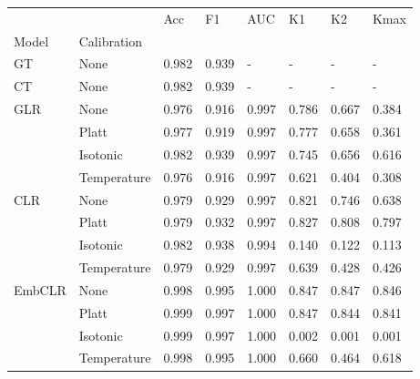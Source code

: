 \begin{tabular}{llllllll}
\toprule
 &  & Acc & F1 & AUC & K1 & K2 & Kmax \\
Model & Calibration &  &  &  &  &  &  \\
\midrule
GT & None & 0.982 & 0.939 & - & - & - & - \\
\cline{1-8}
CT & None & 0.982 & 0.939 & - & - & - & - \\
\cline{1-8}
\multirow[t]{4}{*}{GLR} & None & 0.976 & 0.916 & 0.997 & 0.786 & 0.667 & 0.384 \\
 & Platt & 0.977 & 0.919 & 0.997 & 0.777 & 0.658 & 0.361 \\
 & Isotonic & 0.982 & 0.939 & 0.997 & 0.745 & 0.656 & 0.616 \\
 & Temperature & 0.976 & 0.916 & 0.997 & 0.621 & 0.404 & 0.308 \\
\cline{1-8}
\multirow[t]{4}{*}{CLR} & None & 0.979 & 0.929 & 0.997 & 0.821 & 0.746 & 0.638 \\
 & Platt & 0.979 & 0.932 & 0.997 & 0.827 & 0.808 & 0.797 \\
 & Isotonic & 0.982 & 0.938 & 0.994 & 0.140 & 0.122 & 0.113 \\
 & Temperature & 0.979 & 0.929 & 0.997 & 0.639 & 0.428 & 0.426 \\
\cline{1-8}
\multirow[t]{4}{*}{EmbCLR} & None & 0.998 & 0.995 & 1.000 & 0.847 & 0.847 & 0.846 \\
 & Platt & 0.999 & 0.997 & 1.000 & 0.847 & 0.844 & 0.841 \\
 & Isotonic & 0.999 & 0.997 & 1.000 & 0.002 & 0.001 & 0.001 \\
 & Temperature & 0.998 & 0.995 & 1.000 & 0.660 & 0.464 & 0.618 \\
\cline{1-8}
\bottomrule
\end{tabular}
